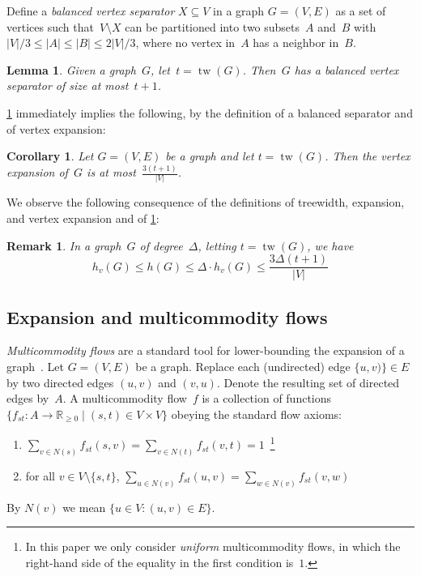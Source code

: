 \documentclass[
final
]{dmtcs-episciences}
\newcommand{\tw}{\operatorname{tw}}
\newtheorem{lemma}[theorem]{Lemma}
\newtheorem{corollary}[theorem]{Corollary}
\newtheorem{remark}[theorem]{Remark}
\begin{document}
Define a \emph{balanced vertex separator} $X \subseteq V$ in a graph $G = (V, E)$ as a set of vertices such that~$V \setminus X$ can be partitioned into two subsets~$A$ and~$B$ with $|V|/3 \leq |A| \leq |B| \leq 2|V|/3$, where no vertex in~$A$ has a neighbor in~$B$.


\begin{lemma}\citep{ericksontw}
\label{lem:balsep}
Given a graph~$G$, let~$t = \tw(G)$. Then~$G$ has a balanced vertex separator of size at most~$t+1$.
\end{lemma}

\cref{lem:balsep} immediately implies the following, by the definition of a balanced separator and of vertex expansion:
\begin{corollary}
\label{cor:sepvexp}
Let $G = (V, E)$ be a graph and let $t = \tw(G)$. Then the vertex expansion of~$G$ is at most~$\frac{3(t+1)}{|V|}$.
\end{corollary}

We observe the following consequence of the definitions of treewidth, expansion, and vertex expansion and of \cref{cor:sepvexp}:
\begin{remark}
\label{rmk:twexp}
    In a graph~$G$ of degree~$\Delta$, letting $t = \tw(G)$, we have 
    \[h_v(G) \leq h(G) \leq \Delta\cdot h_v(G) \leq \frac{3\Delta(t+1)}{|V|}\]
\end{remark}

\subsection{Expansion and multicommodity flows}
\label{sec:expmcflow}
\emph{Multicommodity flows} are a standard tool for lower-bounding the expansion of a graph~\citep{sinclair_1992, kaibelexp}. Let $G = (V, E)$ be a graph. Replace each (undirected) edge $\{u, v)\} \in E$ by two directed edges $(u, v)$ and $(v, u)$. Denote the resulting set of directed edges by~$A$. A multicommodity flow~$f$ is a collection of functions~$\{f_{st}: A \rightarrow \mathbb{R}_{\geq 0} \mid (s, t) \in V \times V\}$ obeying the standard flow axioms:
\begin{enumerate}
    \item $\sum_{v \in N(s)} f_{st}(s, v) = \sum_{v \in N(t)} f_{st}(v, t) = 1$~\footnote{In this paper we only consider \emph{uniform} multicommodity flows, in which the right-hand side of the equality in the first condition is~$1$.}
    \item for all $v \in V \setminus \{s, t\}$, $\sum_{u \in N(v)} f_{st}(u, v) = \sum_{w \in N(v)} f_{st}(v, w)$
\end{enumerate}
By $N(v)$ we mean $\{u \in V: (u, v) \in E\}$.
\end{document}
